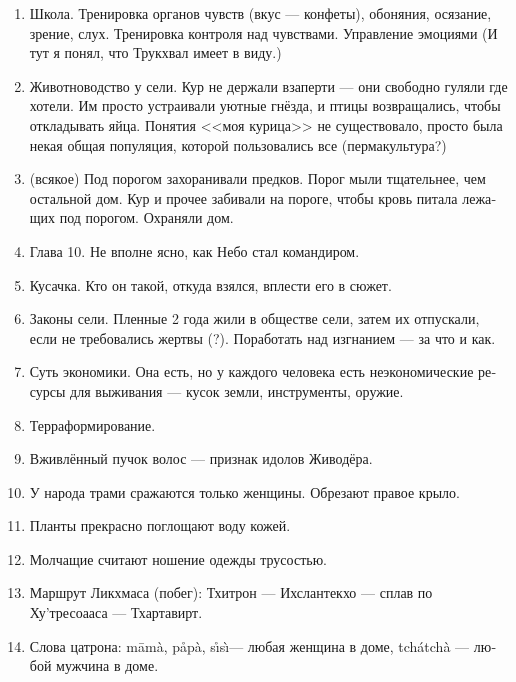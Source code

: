 \documentclass[a4paper,12pt,fleqn]{book}\usepackage{polyglossia}\setdefaultlanguage[babelshorthands=true]{russian}\setotherlanguage{english}\defaultfontfeatures{Ligatures=TeX,Mapping=tex-text}\usepackage{xcolor}\newcommand{\ml}[3]{#2}
\begin{document}
{\begin{enumerate}
\item Школа.
Тренировка органов чувств (вкус --- конфеты), обоняния, осязание, зрение, слух.
Тренировка контроля над чувствами.
Управление эмоциями (И тут я понял, что Трукхвал имеет в виду.)

\item Животноводство у сели.
Кур не держали взаперти --- они свободно гуляли где хотели.
Им просто устраивали уютные гнёзда, и птицы возвращались, чтобы откладывать яйца.
Понятия <<моя курица>> не существовало, просто была некая общая популяция, которой пользовались все (пермакультура?)

\item (всякое) Под порогом захоранивали предков.
Порог мыли тщательнее, чем остальной дом.
Кур и прочее забивали на пороге, чтобы кровь питала лежащих под порогом.
Охраняли дом.

\item Глава 10.
Не вполне ясно, как Небо стал командиром.

\item Кусачка.
Кто он такой, откуда взялся, вплести его в сюжет.

\item Законы сели.
Пленные 2 года жили в обществе сели, затем их отпускали, если не требовались жертвы (?).
Поработать над изгнанием --- за что и как.

\item Суть экономики.
Она есть, но у каждого человека есть неэкономические ресурсы для выживания --- кусок земли, инструменты, оружие.

\item Терраформирование.

\item Вживлённый пучок волос --- признак идолов Живодёра.

\item У народа трами сражаются только женщины.
Обрезают правое крыло.

\item Планты прекрасно поглощают воду кожей.

\item Молчащие считают ношение одежды трусостью.

\item Маршрут Ликхмаса (побег): Тхитрон --- Ихслантекхо --- сплав по Ху'тресоааса --- Тхартавирт.

\item Слова цатрона: m\=am\`a, p\r{a}p\`a, s\r{\i}s\`\i --- любая женщина в доме, tch\'atch\`a --- любой мужчина в доме.


\end{enumerate}}
\end{document}
